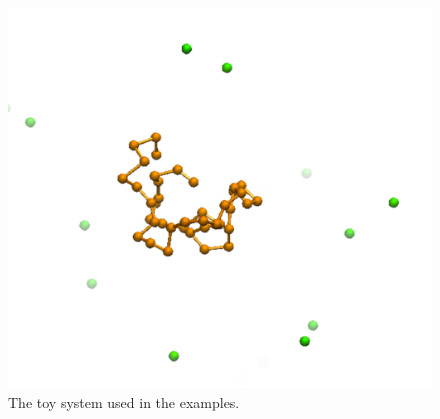 \documentclass[10pt,fleqn,a4paper]{report}
\begin{document}
\begin{figure}[h!]
\begin{center}
\includegraphics[width=14cm,angle=0]{./figures/system}
\caption{The toy system used in the examples.}
\label{system}
\end{center}
\end{figure} 
\end{document}
